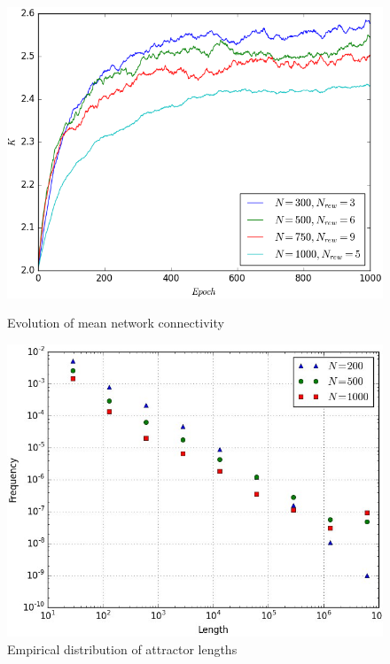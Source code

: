 \documentclass[procedia]{easychair}
\begin{document}
	
	\begin{figure}[h]
		\begin{minipage}[t]{0.45\textwidth}
			\includegraphics[width=1.0\textwidth]{plots/evolution}
			\caption{Evolution of mean network connectivity}
			\label{fig:evolution}
		\end{minipage}\hfill
		\begin{minipage}[t]{0.45\textwidth}
			\centering
			\includegraphics[width=1.0\textwidth]{plots/attractors}
			\caption{Empirical distribution of attractor lengths}
			\label{fig:attractors}
		\end{minipage}
	\end{figure}
\end{document}
